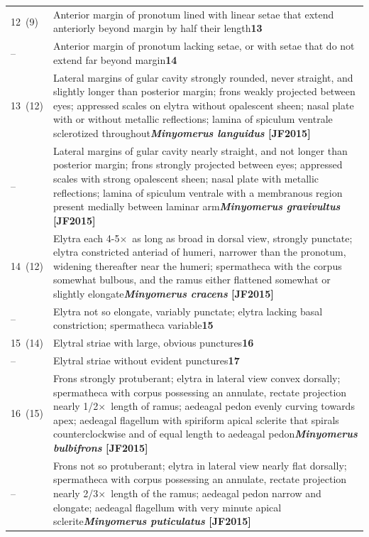 \documentclass[fleqn,10pt,lineno]{wlpeerj} %
\newcommand{\x}{$\times$~}
\newcommand{\breakfill}{\dotfill\newline\penalty0\hbox{}\nobreak\dotfill}
\begin{document}
\begin{xtabular}{@{}
                p{\dimexpr.1\textwidth-\tabcolsep\relax}
                p{\dimexpr.9\textwidth-\tabcolsep\relax}@{}}
		{12~(9)} & {Anterior margin of pronotum lined with linear setae that extend anteriorly beyond margin by half their length}{\dotfill}{\textbf{13}}\\
		{--} & {Anterior margin of pronotum lacking setae, or with setae that do not extend far beyond margin}{\breakfill}{\textbf{14}}\\
		
		{13~(12)} & {Lateral margins of gular cavity strongly rounded, never straight, and slightly longer than posterior margin; frons weakly projected between eyes; appressed scales on elytra without opalescent sheen; nasal plate with or without metallic reflections; lamina of spiculum ventrale sclerotized throughout}{\dotfill}{\textbf{\textit{Minyomerus languidus} [JF2015]}}\\
		{--} & {Lateral margins of gular cavity nearly straight, and not longer than posterior margin; frons strongly projected between eyes; appressed scales with strong opalescent sheen; nasal plate with metallic reflections; lamina of spiculum ventrale with a membranous region present medially between laminar arm}{\dotfill}{\textbf{\textit{Minyomerus gravivultus} [JF2015]}}\\
		
		{14~(12)} & {Elytra each 4-5\x as long as broad in dorsal view, strongly punctate; elytra constricted anteriad of humeri, narrower than the pronotum, widening thereafter near the humeri; spermatheca with the corpus somewhat bulbous, and the ramus either flattened somewhat or slightly elongate}{\breakfill}{\textbf{\textit{Minyomerus cracens} [JF2015]}}\\
		{--} & {Elytra not so elongate, variably punctate; elytra lacking basal constriction; spermatheca variable}{\dotfill}{\textbf{15}}\\
		
		{15~(14)} & {Elytral striae with large, obvious punctures}{\dotfill}{\textbf{16}}\\
		{--} & {Elytral striae without evident punctures}{\dotfill}{\textbf{17}}\\
		
		{16~(15)} & {Frons strongly protuberant; elytra in lateral view convex dorsally; spermatheca with corpus possessing an annulate, rectate projection nearly 1/2\x length of ramus; aedeagal pedon evenly curving towards apex; aedeagal flagellum with spiriform apical sclerite that spirals counterclockwise and of equal length to aedeagal pedon}{\breakfill}{\textbf{\textit{Minyomerus bulbifrons} [JF2015]}}\\
		{--} & {Frons not so protuberant; elytra in lateral view nearly flat dorsally; spermatheca with corpus possessing an annulate, rectate projection nearly 2/3\x length of the ramus; aedeagal pedon narrow and elongate; aedeagal flagellum with very minute apical sclerite}{\breakfill}{\textbf{\textit{Minyomerus puticulatus} [JF2015]}}\\
		

\end{xtabular}
\end{document}
